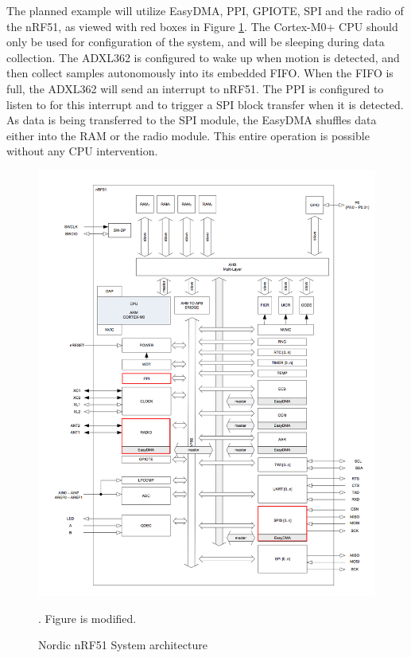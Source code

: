 The planned example will utilize EasyDMA, PPI, GPIOTE, SPI and the radio of the nRF51, as viewed with red boxes in Figure \ref{fig:accel_working_principle}. The Cortex-M0+ CPU should only be used for configuration of the system, and will be sleeping during data collection. The ADXL362 is configured to wake up when motion is detected, and then collect samples autonomously into its embedded FIFO. When the FIFO is full, the ADXL362 will send an interrupt to nRF51. The PPI is configured to listen to for this interrupt and to trigger a SPI block transfer when it is detected. As data is being transferred to the SPI module, the EasyDMA shuffles data either into the RAM or the radio module. This entire operation is possible without any CPU intervention.

\begin{figure}[h]
\centering
\includegraphics[scale=0.5]{fig/nrf51822_edit.png}
\caption{Nordic nRF51 System architecture \cite{nRF51}}. Figure is modified.
\label{fig:accel_working_principle}
\end{figure}

